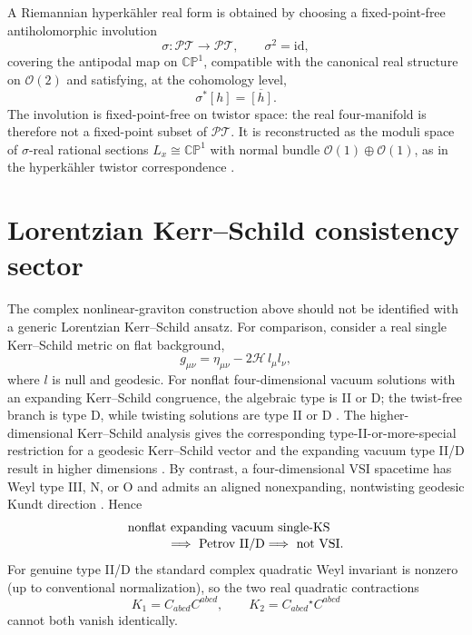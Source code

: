 \documentclass[aps,prd,reprint,nofootinbib,superscriptaddress]{revtex4-2}
\theoremstyle{definition}
\theoremstyle{remark}
\newcommand{\CP}{\mathbb{CP}}
\newcommand{\cO}{\mathcal{O}}
\newcommand{\PT}{\mathcal{PT}}
\newcommand{\id}{\mathrm{id}}
\begin{document}
A Riemannian hyperk\"ahler real form is obtained by choosing a fixed-point-free antiholomorphic involution
\begin{equation}
\sigma:\PT\to\PT,
\qquad \sigma^2=\id,
\label{eq:reality}
\end{equation}
covering the antipodal map on $\CP^1$, compatible with the canonical real structure on $\cO(2)$ and satisfying, at the cohomology level,
\begin{equation}
\sigma^*[h]=\overline{[h]}.
\label{eq:realh}
\end{equation}
The involution is fixed-point-free on twistor space: the real four-manifold is therefore not a fixed-point subset of $\PT$.  It is reconstructed as the moduli space of $\sigma$-real rational sections $L_x\cong\CP^1$ with normal bundle $\cO(1)\oplus\cO(1)$, as in the hyperk\"ahler twistor correspondence \cite{HitchinKarlhede1987}.

\section{Lorentzian Kerr--Schild consistency sector}
\label{sec:kerr}

The complex nonlinear-graviton construction above should not be identified with a generic Lorentzian Kerr--Schild ansatz. For comparison, consider a real single Kerr--Schild metric on flat background,
\begin{equation}
g_{\mu\nu}=\eta_{\mu\nu}-2\mathcal H\,l_\mu l_\nu,
\label{eq:KS}
\end{equation}
where $l$ is null and geodesic. For nonflat four-dimensional vacuum solutions with an expanding Kerr--Schild congruence, the algebraic type is II or D; the twist-free branch is type D, while twisting solutions are type II or D \cite{McIntosh1989}.  The higher-dimensional Kerr--Schild analysis gives the corresponding type-II-or-more-special restriction for a geodesic Kerr--Schild vector and the expanding vacuum type II/D result in higher dimensions \cite{Ortaggio2009}. By contrast, a four-dimensional VSI spacetime has Weyl type III, N, or O and admits an aligned nonexpanding, nontwisting geodesic Kundt direction \cite{Coley2004}. Hence
\begin{align}
&\text{nonflat expanding vacuum single-KS}\nonumber\\[-2pt]
&\hspace{1.1cm}\Longrightarrow\ \text{Petrov II/D}
\Longrightarrow\ \text{not VSI}.
\label{eq:KSnotVSI}
\end{align}
For genuine type II/D the standard complex quadratic Weyl invariant is nonzero (up to conventional normalization), so the two real quadratic contractions
\[
K_1=C_{abcd}C^{abcd},
\qquad
K_2=C_{abcd}{}^\star C^{abcd}
\]
cannot both vanish identically.
\end{document}
